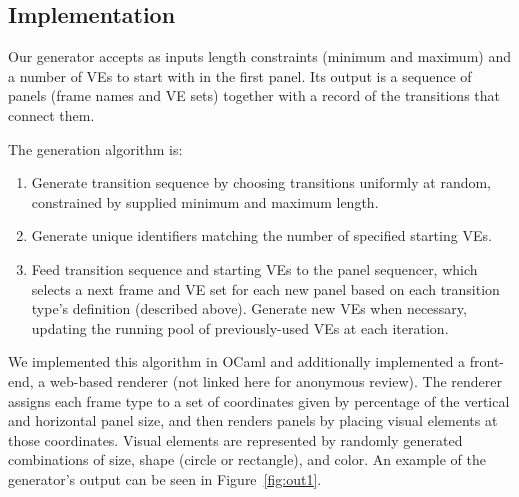 \subsection{Implementation}

Our generator accepts as inputs length constraints (minimum and maximum)
and a number of VEs to start with in the first panel. Its output is a
sequence of panels (frame names and VE sets) together with a record of the
transitions that connect them.

The generation algorithm is:
\begin{enumerate}
\item Generate transition sequence by choosing transitions uniformly at
random, constrained by supplied minimum and maximum length.
\item Generate unique identifiers matching the number of specified starting
VEs.
\item Feed transition sequence and starting VEs to the panel sequencer,
which selects a next frame and VE set for each new panel based on each
transition type's definition (described above). Generate new VEs when
necessary, updating the running pool of previously-used VEs at each
iteration.
\end{enumerate}

We implemented this algorithm in OCaml and additionally implemented a
front-end, a web-based renderer (not linked here for anonymous review). The
renderer assigns each frame type to a set of coordinates given by
percentage of the vertical and horizontal panel size, and then renders
panels by placing visual elements at those coordinates. Visual elements are
represented by randomly generated combinations of size, shape (circle or
rectangle), and color.  An example of the generator's output can be seen in
Figure~\ref{fig:out1}. 

